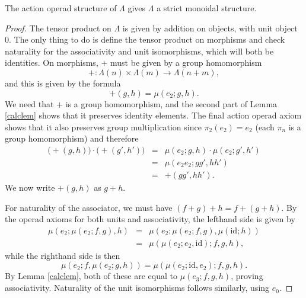 \documentclass{amsbook} %
\numberwithin{section}{chapter}
\begin{document}
\begin{prop}\label{Gmonoidal}
The action operad structure of $\Lambda$ gives $\mathbb{\Lambda}$ a strict monoidal structure.
\end{prop}
\begin{proof}
The tensor product on $\mathbb{\Lambda}$ is given by addition on objects, with unit object 0.  The only thing to do is define the tensor product on morphisms and check naturality for the associativity and unit isomorphisms, which will both be identities.  On morphisms, $+$ must be given by a group homomorphism
\[
+:\Lambda(n) \times \Lambda(m) \rightarrow \Lambda(n+m),
\]
 and this is given by the formula
\[
+(g,h) = \mu(e_{2}; g,h).
\]
We need that $+$ is a group homomorphism, and the second part of Lemma \ref{calclem} shows that it preserves identity elements.  The final action operad axiom shows that it also preserves group multiplication since $\pi_{2}(e_{2}) = e_{2}$ (each $\pi_{n}$ is a group homomorphism) and therefore
\[
\begin{array}{rcl}
\Big(+(g,h)\Big) \cdot \Big(+(g',h')\Big) & = & \mu(e_{2}; g,h) \cdot \mu(e_{2}; g',h') \\
 & = & \mu(e_{2}e_{2}; gg', hh') \\
& = & +(gg',hh').
\end{array}
\]
We now write $+(g,h)$ as $g+h$.

For naturality of the associator, we must have $(f+g)+h = f+(g+h)$.  By the operad axioms for both units and associativity, the lefthand side is given by
\[
\begin{array}{rcl}
\mu(e_{2}; \mu(e_{2}; f,g), h) & = & \mu(e_{2}; \mu(e_{2}; f,g), \mu(\textrm{id};h)) \\
& = & \mu(\mu(e_{2}; e_{2}, \textrm{id}); f,g,h),
\end{array}
\]
while the righthand side is then
\[
\mu(e_{2}; f, \mu(e_{2}; g,h)) = \mu(\mu(e_{2}; \textrm{id}, e_{2}); f,g,h).
\]
By Lemma \ref{calclem}, both of these are equal to $\mu(e_{3}; f,g,h)$, proving associativity.  Naturality of the unit isomorphisms follows similarly, using $e_{0}$.
\end{proof}
\end{document}
